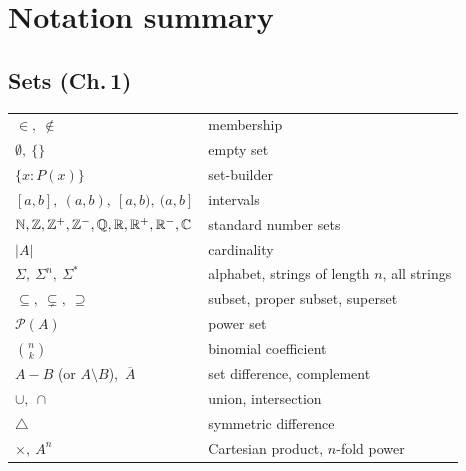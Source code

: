 \newpage
\section*{Notation summary}

\subsection*{Sets (Ch.\,1)}
\begin{longtable}{ll}
$\in,\ \notin$ & membership \\
$\emptyset,\ \{\}$ & empty set \\
$\{x : P(x)\}$ & set-builder \\
$[a,b],\ (a,b),\ [a,b),\ (a,b]$ & intervals \\
$\mathbb{N},\mathbb{Z},\mathbb{Z}^+,\mathbb{Z}^-,\mathbb{Q},\mathbb{R},\mathbb{R}^+,\mathbb{R}^-,\mathbb{C}$ & standard number sets \\
$|A|$ & cardinality \\
$\Sigma,\ \Sigma^n,\ \Sigma^*$ & alphabet, strings of length $n$, all strings \\
$\subseteq,\ \subsetneq,\ \supseteq$ & subset, proper subset, superset \\
$\mathcal P(A)$ & power set \\
$\binom{n}{k}$ & binomial coefficient \\
$A-B$ (or $A\setminus B$),\ $\overline{A}$ & set difference, complement \\
$\cup,\ \cap$ & union, intersection \\
$\triangle$ & symmetric difference \\
$\times,\ A^n$ & Cartesian product, $n$-fold power \\
\end{longtable}

